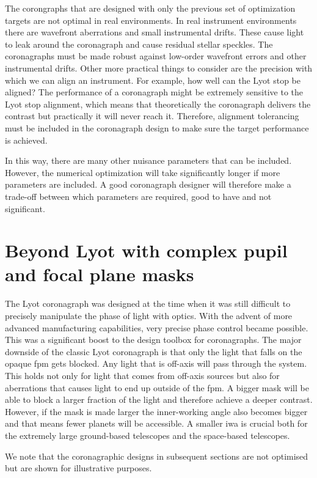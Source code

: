 \documentclass[letterpaper]{ar-1col}
\begin{document}
The corongraphs that are designed with only the previous set of optimization targets are not optimal in real environments.
%
In real instrument environments there are wavefront aberrations and small instrumental drifts.
%
These cause light to leak around the coronagraph and cause residual stellar speckles.
%
The coronagraphs must be made robust against low-order wavefront errors and other instrumental drifts.
%
Other more practical things to consider are the precision with which we can align an instrument.
%
For example, how well can the Lyot stop be aligned?
%
The performance of a coronagraph might be extremely sensitive to the Lyot stop alignment, which means that theoretically the coronagraph delivers the contrast but practically it will never reach it.
%
Therefore, alignment tolerancing must be included in the coronagraph design to make sure the target performance is achieved.

In this way, there are many other nuisance parameters that can be included.
%
However, the numerical optimization will take significantly longer if more parameters are included.
%
A good coronagraph designer will therefore make a trade-off between which parameters are required, good to have and not significant.

\section{Beyond Lyot with complex pupil and focal plane masks}


The Lyot coronagraph was designed at the time when it was still difficult to precisely manipulate the phase of light with optics.
%
With the advent of more advanced manufacturing capabilities, very precise phase control became possible.
%
This was a significant boost to the design toolbox for coronagraphs.
%
The major downside of the classic Lyot coronagraph is that only the light that falls on the opaque \ac{fpm} gets blocked.
%
Any light that is off-axis will pass through the system.
%
This holds not only for light that comes from off-axis sources but also for aberrations that causes light to end up outside of the \ac{fpm}.
%
A bigger mask will be able to block a larger fraction of the light and therefore achieve a deeper contrast.
%
However, if the mask is made larger the inner-working angle also becomes bigger and that means fewer planets will be accessible.
%
A smaller \ac{iwa} is crucial both for the extremely large ground-based telescopes and the space-based telescopes. 

We note that the coronagraphic designs in subsequent sections are not optimised but are shown for illustrative purposes.
\end{document}
